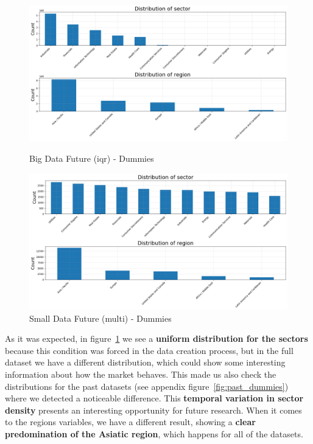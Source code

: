 \documentclass[11pt,english,a4paper,hidelinks]{book}
\begin{document}
\begin{figure}[H]
    \centering
    \begin{minipage}{0.48\textwidth}
        \centering
        \includegraphics[width=1\linewidth]{images/code/descriptive analysis/distributions/Big Data future - Dummies.png}
        \caption{Big Data Future (\acrshort{iqr}) - Dummies}
        \label{fig:big_future_dummies}
    \end{minipage}\hfill
    \begin{minipage}{0.48\textwidth}
        \centering
        \includegraphics[width=1\linewidth]{images/code/descriptive analysis/distributions/Small Data future MCOD - Dummies.png}
        \caption{Small Data Future (\acrshort{multi}) - Dummies}
        \label{fig:small_future_dummies}
    \end{minipage}
\end{figure}

\noindent As it was expected, in figure~\ref{fig:small_future_dummies} we see a \textbf{uniform distribution for the sectors} because this condition was forced in the data creation process, but in the full dataset we have a different distribution, which could show some interesting information about how the market behaves. This made us also check the distributions for the past datasets (see appendix figure~\ref{fig:past_dummies}) where we detected a noticeable difference. This \textbf{temporal variation in sector density} presents an interesting opportunity for future research. When it comes to the regions variables, we have a different result, showing a \textbf{clear predomination of the Asiatic region}, which happens for all of the datasets. 
\end{document}
